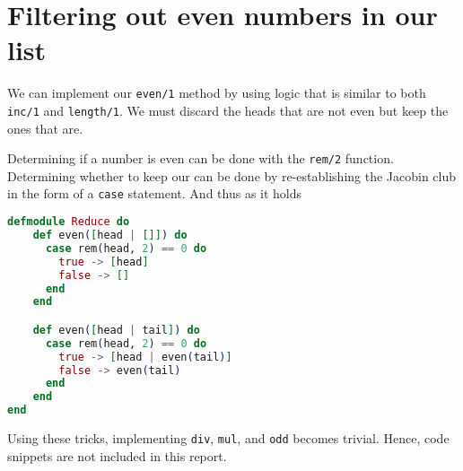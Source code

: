 \section{Filtering out even numbers in our list}
We can implement our \texttt{even/1} method by using logic that is similar to both \texttt{inc/1} and \texttt{length/1}. We must discard the heads that are not even but keep the ones that are. 

Determining if a number is even can be done with the \texttt{rem/2} function. Determining whether to keep our can be done by re-establishing the Jacobin club in the form of a \texttt{case} statement. And thus as it holds

\begin{lstlisting}[language=Elixir, caption=Even numbers\, even-tually]
defmodule Reduce do
    def even([head | []]) do
      case rem(head, 2) == 0 do
        true -> [head]
        false -> []
      end
    end

    def even([head | tail]) do
      case rem(head, 2) == 0 do
        true -> [head | even(tail)]
        false -> even(tail)
      end
    end
end
\end{lstlisting}

Using these tricks, implementing \texttt{div}, \texttt{mul}, and \texttt{odd}  becomes trivial. Hence, code snippets are not included in this report.